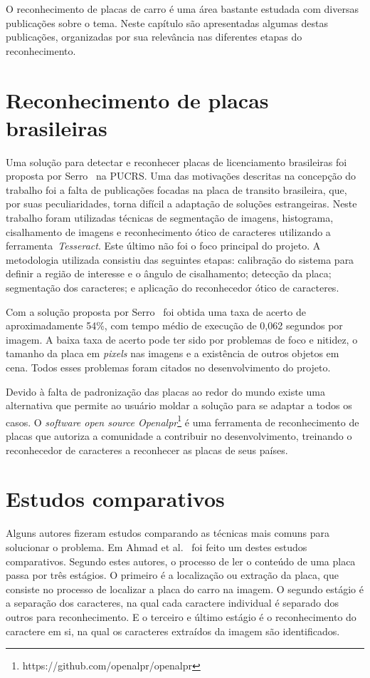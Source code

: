 O reconhecimento de placas de carro é uma área bastante estudada com diversas publicações sobre o tema. Neste capítulo são apresentadas algumas destas publicações, organizadas por sua relevância nas diferentes etapas do reconhecimento.

\section{Reconhecimento de placas brasileiras}

Uma solução para detectar e reconhecer placas de licenciamento brasileiras foi
proposta por Serro~\cite{serro2012deteccao} na PUCRS\@. Uma das motivações descritas na concepção do trabalho foi a falta de publicações focadas na placa de transito brasileira, que, por suas peculiaridades,
torna difícil a adaptação de soluções estrangeiras. Neste trabalho foram
utilizadas técnicas de segmentação de imagens, histograma, cisalhamento de
imagens e reconhecimento ótico de caracteres utilizando a ferramenta~\emph{Tesseract}. Este último não foi o foco principal do projeto. A metodologia utilizada consistiu das
seguintes etapas: calibração do sistema
para definir a região de interesse e o ângulo de cisalhamento; detecção da
placa; segmentação dos caracteres; e aplicação do reconhecedor ótico de
caracteres.

Com a solução proposta por Serro~\cite{serro2012deteccao}  foi obtida uma taxa de
acerto de aproximadamente 54\%, com tempo médio de execução de 0,062 segundos por imagem.
A baixa taxa de acerto pode ter sido por problemas de foco e nitidez, o tamanho da placa em
\emph{pixels} nas imagens e a existência de outros objetos em cena. Todos esses problemas foram citados no desenvolvimento do projeto.

Devido à falta de padronização das placas ao redor do mundo existe uma alternativa que permite ao usuário moldar a solução para se adaptar a todos os casos.  O \emph{software open source Openalpr}\footnote{https://github.com/openalpr/openalpr}
é uma ferramenta de reconhecimento de placas que autoriza a comunidade a contribuir no desenvolvimento, treinando o reconhecedor de caracteres a reconhecer as placas de seus países. 

\section{Estudos comparativos}
Alguns autores fizeram estudos comparando as técnicas mais comuns para solucionar o problema. Em Ahmad et al.~\cite{ahmad2015automatic} foi feito um  destes estudos comparativos. Segundo estes
autores, o processo de ler o conteúdo de uma placa passa por três estágios. O primeiro é a localização ou extração da placa, que consiste no processo de
localizar a placa do carro na imagem. O segundo estágio é a separação dos
caracteres, na qual cada caractere individual é separado dos outros para
reconhecimento. E o terceiro e último estágio é o reconhecimento do caractere em si, na qual os caracteres extraídos da imagem são identificados.

